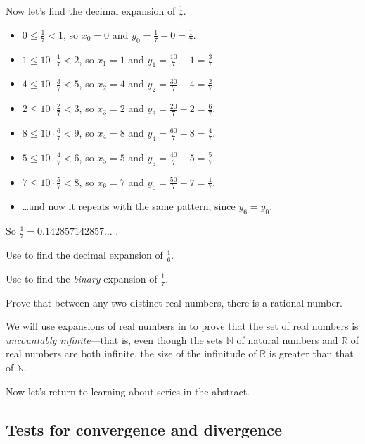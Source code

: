 \begin{example}
Now let's find the decimal expansion of $\frac{1}{7}$.
\begin{itemize}
\item $0 \le \frac{1}{7} < 1$, so $x_0 = 0$ and $y_0 = \frac{1}{7} - 0 = \frac{1}{7}$.
\item $1 \le 10 \cdot \frac{1}{7} < 2$, so $x_1 = 1$ and $y_1 = \frac{10}{7}-1 = \frac{3}{7}$.
\item $4 \le 10 \cdot \frac{3}{7} < 5$, so $x_2 = 4$ and $y_2 = \frac{30}{7}-4 = \frac{2}{7}$.
\item $2 \le 10 \cdot \frac{2}{7} < 3$, so $x_3 = 2$ and $y_3 = \frac{20}{7}-2 = \frac{6}{7}$.
\item $8 \le 10 \cdot \frac{6}{7} < 9$, so $x_4 = 8$ and $y_4 = \frac{60}{7}-8 = \frac{4}{7}$.
\item $5 \le 10 \cdot \frac{4}{7} < 6$, so $x_5 = 5$ and $y_5 = \frac{40}{7}-5 = \frac{5}{7}$.
\item $7 \le 10 \cdot \frac{5}{7} < 8$, so $x_6 = 7$ and $y_6 = \frac{50}{7}-7 = \frac{1}{7}$.
\item \dots{}and now it repeats with the same pattern, since $y_6 = y_0$.
\end{itemize}
So $\frac{1}{7} = 0.142857142857\dots{}$ .
\end{example}

\begin{exercise}
Use  to find the decimal expansion of $\frac{1}{6}$.
\end{exercise}

\begin{exercise}
Use  to find the \textit{binary} expansion of $\frac{1}{7}$.
\end{exercise}

\begin{exercise}
Prove that between any two distinct real numbers, there is a rational number.
\end{exercise}

We will use expansions of real numbers in  to prove that the set of real numbers is \textit{uncountably infinite}---that is, even though the sets $\mathbb{N}$ of natural numbers and $\mathbb{R}$ of real numbers are both infinite, the size of the infinitude of $\mathbb{R}$ is greater than that of $\mathbb{N}$.

Now let's return to learning about series in the abstract.

\subsection*{Tests for convergence and divergence}


